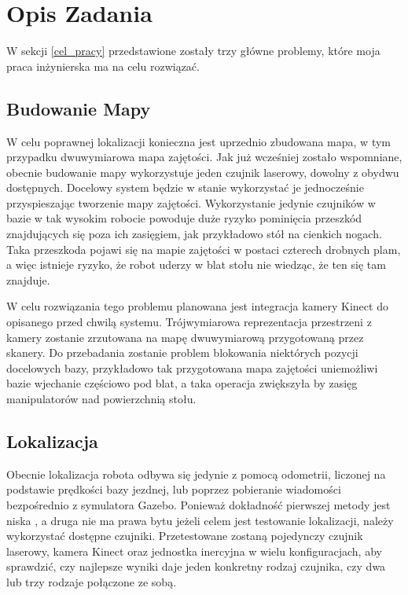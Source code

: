 \section{Opis Zadania}
\label{opis_zadania}

W sekcji \ref{cel_pracy} przedstawione zostały trzy główne problemy, które moja praca inżynierska ma na celu rozwiązać.

\subsection{Budowanie Mapy}

	W celu poprawnej lokalizacji konieczna jest uprzednio zbudowana mapa, w tym przypadku dwuwymiarowa mapa zajętości. 
	Jak już wcześniej zostało wspomniane, obecnie budowanie mapy wykorzystuje jeden czujnik laserowy, dowolny z obydwu dostępnych. 
	Docelowy system będzie w stanie wykorzystać je jednocześnie przyspieszając tworzenie mapy zajętości.
	Wykorzystanie jedynie czujników w bazie w tak wysokim robocie powoduje duże ryzyko pominięcia przeszkód znajdujących się poza ich zasięgiem, jak przykładowo stół na cienkich nogach.
	Taka przeszkoda pojawi się na mapie zajętości w postaci czterech drobnych plam, a więc istnieje ryzyko, że robot uderzy w blat stołu nie wiedząc, że ten się tam znajduje.



	W celu rozwiązania tego problemu planowana jest integracja kamery Kinect do opisanego przed chwilą systemu. 
	Trójwymiarowa reprezentacja przestrzeni z kamery zostanie zrzutowana na mapę dwuwymiarową przygotowaną przez skanery.
	Do przebadania zostanie problem blokowania niektórych pozycji docelowych bazy, przykładowo tak przygotowana mapa zajętości uniemożliwi bazie wjechanie częściowo pod blat, a taka operacja zwiększyła by zasięg manipulatorów nad powierzchnią stołu.

\subsection{Lokalizacja}


	Obecnie lokalizacja robota odbywa się jedynie z pomocą odometrii, liczonej na podstawie prędkości bazy jezdnej, lub poprzez pobieranie wiadomości bezpośrednio z symulatora Gazebo.
	Ponieważ dokładność pierwszej metody jest niska \cite{jsikora-bsc-20-twiki}, a druga nie ma prawa bytu jeżeli celem jest testowanie lokalizacji, należy wykorzystać dostępne czujniki.
	Przetestowane zostaną pojedynczy czujnik laserowy, kamera Kinect oraz jednostka inercyjna w wielu konfiguracjach, aby sprawdzić, czy najlepsze wyniki daje jeden konkretny rodzaj czujnika, czy dwa lub trzy rodzaje połączone ze sobą.

